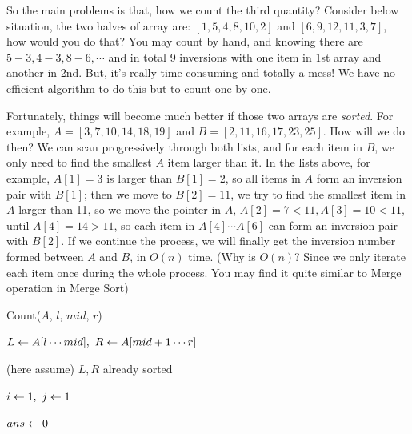 \documentclass[11pt, a4paper]{COMP3711}
\begin{document}
\begin{spacing}{1.5}
    So the main problems is that, how we count the third quantity?
    Consider below situation, the two halves of array are:
    $[1,5,4,8,10,2]$ and $[6,9,12,11,3,7]$, how would you do that?
    You may count by hand, and knowing there are $5-3, 4-3, 8-6, \cdots$
    and in total 9 inversions with one item in 1st array and another in 
    2nd. But, it's really time consuming and totally a mess! We have 
    no efficient algorithm to do this but to count one by one.

    Fortunately, things will become much better if those two arrays are 
    {\it sorted}. For example, $A=[3,7,10,14,18,19]$ and 
    $B=[2,11,16,17,23,25]$. How will we do then? We can 
    scan progressively through both lists, and for each item 
    in $B$, we only need to find the smallest $A$ item 
    larger than it. In the lists above, for example, $A[1]=3$
    is larger than $B[1]=2$, so all items in $A$ form an inversion pair 
    with $B[1]$; then we move to $B[2]=11$, we try to find the smallest 
    item in $A$ larger than 11, so we move the pointer in $A$, 
    $A[2]=7<11, A[3]=10<11$, until $A[4]=14>11$, so 
    each item in $A[4]\cdots A[6]$ can form an inversion pair with $B[2]$.
    If we continue the process, we will finally get the inversion 
    number formed between $A$ and $B$, in $O(n)$ time. (Why is $O(n)$?
    Since we only iterate each item once during the whole process.
    You may find it quite similar to Merge operation in Merge Sort)

    \begin{algorithm}
        \caption{Count($A$, $l$, $mid$, $r$)}

        $L\leftarrow A[l\cdots mid],\ R\leftarrow A[mid+1\cdots r]$

        (here assume) $L, R$ already sorted

        $i\leftarrow 1,\ j\leftarrow 1$\qquad {}

        $ans\leftarrow 0$ \qquad {}

\end{algorithm}
\end{spacing}
\end{document}
